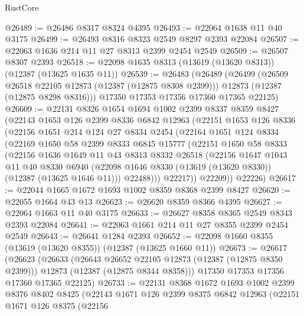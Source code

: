 \begin{lexlean}{RustCore}
\begin{coremodule}
@26489 := @26486 @8317 @8324 @4395
@26493 := @22064 @1638 @11 @40 @3175
@26499 := @26493 @8316 @8323 @2549 @8297 @2393 @22084
@26507 := @22063 @1636 @214 @11 @27 @8313 @2399 @2454 @2549
@26509 := @26507 @8307 @2393
@26518 := @22098 @1635 @8313 (@13619 (@13620 @8313)) (@12387 (@13625 @1635 @11))
@26539 := @26483
    (@26489
      (@26499
        (@26509 @26518 @22105 @12873 (@12387 (@12875 @8308 @2399)))
        @12873
        (@12387 (@12875 @8298 @8316)))
      @17350
      @17353
      @17356
      @17360
      @17365
      @22125)
@26609 := @22131
    @8326
    @1654
    @1694
    @1002
    @2399
    @8337
    @8359
    @8427
    (@22143
      @1653
      @126
      @2399
      @8336
      @6842
      @12963
      (@22151
        @1653
        @126
        @8336
        (@22156
          @1651
          @214
          @124
          @27
          @8334
          @2454
          (@22164
            @1651
            @124
            @8334
            (@22169
              @1650
              @58
              @2399
              @8333
              @6845
              @15777
              (@22151
                @1650
                @58
                @8333
                (@22156
                  @1636
                  @1649
                  @11
                  @43
                  @8313
                  @8332
                  @26518
                  (@22156
                    @1647
                    @1043
                    @11
                    @40
                    @8330
                    @6940
                    (@22098 @1646 @8330 (@13619 (@13620 @8330)) (@12387 (@13625 @1646 @11)))
                    @22488)))
              @22217))
          @22209))
      @22226)
@26617 := @22044 @1665 @1672 @1693 @1002 @8359 @8368 @2399 @8427
@26620 := @22055 @1664 @43 @13
@26623 := @26620 @8359 @8366 @4395
@26627 := @22064 @1663 @11 @40 @3175
@26633 := @26627 @8358 @8365 @2549 @8343 @2393 @22084
@26641 := @22063 @1661 @214 @11 @27 @8355 @2399 @2454 @2549
@26643 := @26641 @1284 @2393
@26652 := @22098 @1660 @8355 (@13619 (@13620 @8355)) (@12387 (@13625 @1660 @11))
@26673 := @26617
    (@26623
      (@26633
        (@26643 @26652 @22105 @12873 (@12387 (@12875 @8350 @2399)))
        @12873
        (@12387 (@12875 @8344 @8358)))
      @17350
      @17353
      @17356
      @17360
      @17365
      @22125)
@26733 := @22131
    @8368
    @1672
    @1693
    @1002
    @2399
    @8376
    @8402
    @8425
    (@22143
      @1671
      @126
      @2399
      @8375
      @6842
      @12963
      (@22151
        @1671
        @126
        @8375
        (@22156

\end{coremodule}
\end{lexlean}
